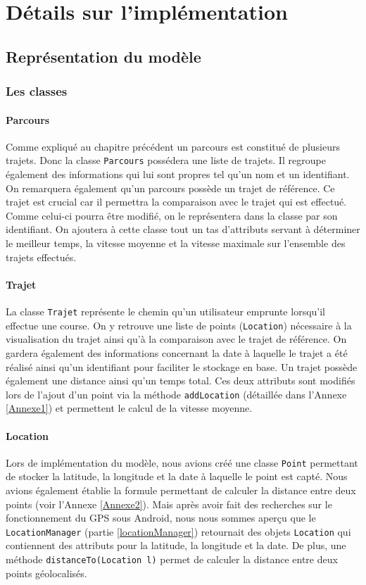 \chapter{Détails sur l'implémentation}
\section{Représentation du modèle}

\subsection{Les classes}
\subsubsection{Parcours}
Comme expliqué au chapitre précédent un parcours est constitué de plusieurs trajets. Donc la classe \verb!Parcours! possédera une liste de trajets. Il regroupe également des informations qui lui sont propres tel qu'un nom et un identifiant. On remarquera également qu'un parcours possède un trajet de référence. Ce trajet est crucial car il permettra la comparaison avec le trajet qui est effectué. Comme celui-ci pourra être modifié, on le représentera dans la classe par son identifiant. On ajoutera à cette classe tout un tas d'attributs servant à déterminer le meilleur temps, la vitesse moyenne et la vitesse maximale sur l'ensemble des trajets effectués.

\subsubsection{Trajet}
La classe \verb!Trajet! représente le chemin qu'un utilisateur emprunte lorsqu'il effectue une course. On y retrouve une liste de points (\verb!Location!) nécessaire à la visualisation du trajet ainsi qu'à la comparaison avec le trajet de référence. On gardera également des  informations concernant la date à laquelle le trajet a été réalisé ainsi qu'un identifiant pour faciliter le stockage en base. Un trajet possède également une distance ainsi qu'un temps total. Ces deux attributs sont modifiés lors de l'ajout d'un point via la méthode \verb!addLocation! (détaillée dans l'Annexe \ref{Annexe1}) et permettent le calcul de la vitesse moyenne.

\subsubsection{Location}
Lors de implémentation du modèle, nous avions créé une classe \verb!Point! permettant de stocker la latitude, la longitude et la date à laquelle le point est capté. Nous avions également établie la formule permettant de calculer la distance entre deux points (voir l'Annexe \ref{Annexe2}). Mais après avoir fait des recherches sur le fonctionnement du GPS sous Android, nous nous sommes aperçu que le \verb!LocationManager! (partie \ref{locationManager}) retournait des objets \verb!Location! qui contiennent des attributs pour la latitude, la longitude et la date. De plus, une méthode \verb!distanceTo(Location l)! permet de calculer la distance entre deux points géolocalisés. 

